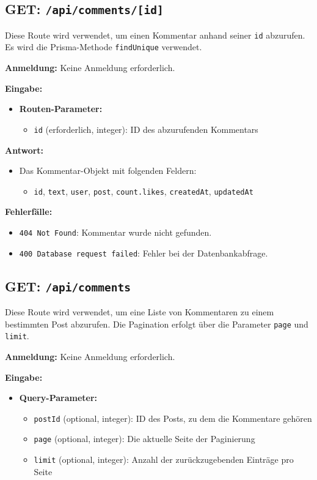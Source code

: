\documentclass[a4paper,12pt]{article}
\begin{document}
\subsection{GET: \texttt{/api/comments/[id]}}

Diese Route wird verwendet, um einen Kommentar anhand seiner \texttt{id} abzurufen. Es wird die Prisma-Methode \texttt{findUnique} verwendet.

\textbf{Anmeldung:} Keine Anmeldung erforderlich.

\textbf{Eingabe:}
\begin{itemize}
    \item \textbf{Routen-Parameter:}
    \begin{itemize}
        \item \texttt{id} (erforderlich, integer): ID des abzurufenden Kommentars
    \end{itemize}
\end{itemize}

\textbf{Antwort:}
\begin{itemize}
    \item Das Kommentar-Objekt mit folgenden Feldern:
    \begin{itemize}
        \item \texttt{id}, \texttt{text}, \texttt{user}, \texttt{post}, \texttt{count.likes}, \texttt{createdAt}, \texttt{updatedAt}
    \end{itemize}
\end{itemize}

\textbf{Fehlerfälle:}
\begin{itemize}
    \item \texttt{404 Not Found}: Kommentar wurde nicht gefunden.
    \item \texttt{400 Database request failed}: Fehler bei der Datenbankabfrage.
\end{itemize}

\subsection{GET: \texttt{/api/comments}}

Diese Route wird verwendet, um eine Liste von Kommentaren zu einem bestimmten Post abzurufen. Die Pagination erfolgt über die Parameter \texttt{page} und \texttt{limit}.

\textbf{Anmeldung:} Keine Anmeldung erforderlich.

\textbf{Eingabe:}
\begin{itemize}
    \item \textbf{Query-Parameter:}
    \begin{itemize}
        \item \texttt{postId} (optional, integer): ID des Posts, zu dem die Kommentare gehören
        \item \texttt{page} (optional, integer): Die aktuelle Seite der Paginierung
        \item \texttt{limit} (optional, integer): Anzahl der zurückzugebenden Einträge pro Seite
    \end{itemize}
\end{itemize}
\end{document}
